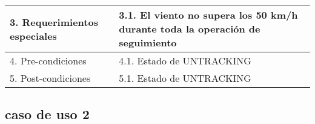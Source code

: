 \documentclass[12pt,a4paper, twosite]{article}
\begin{document}
\begin{tabular}{|p{}|p{}|p{}|p{}|}
		
		\multicolumn{2}{|p{0.3\textwidth}|}{3. Requerimientos especiales } & 
		\multicolumn{2}{|p{0.7\textwidth}|}{ 3.1. El viento no supera los 50 km/h durante toda la operación de seguimiento}  \\ \hline  
		\multicolumn{2}{|p{0.3\textwidth}|}{4. Pre-condiciones }  & \multicolumn{2}{p{0.7\textwidth}|}{ 4.1. Estado de UNTRACKING }  \\   
		\hline 
		\multicolumn{2}{|p{0.3\textwidth}|}{5. Post-condiciones } 
		&   \multicolumn{2}{p{0.7\textwidth}|}{5.1. Estado de UNTRACKING}  \\ \hline  
		
	\end{tabular}
	
	
	\subsection{caso de uso 2 }
	
\end{document}
